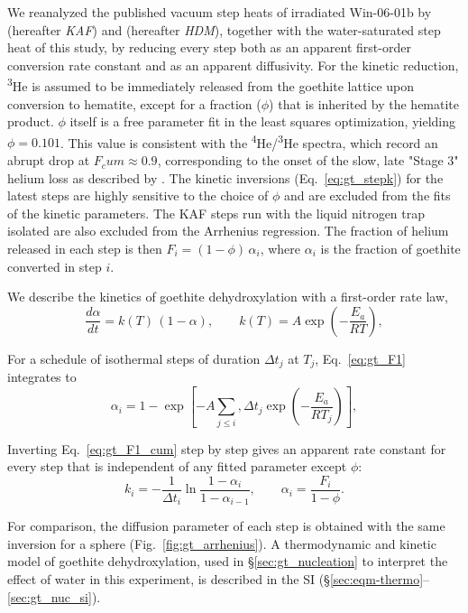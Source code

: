 We reanalyzed the published vacuum step heats of irradiated Win-06-01b by \citet{farley2024} (hereafter \emph{KAF}) and
\citet{monteiro2017} (hereafter \emph{HDM}), together with the water-saturated step heat of this study, by reducing every step
both as an apparent first-order conversion rate constant and as an apparent diffusivity.
For the kinetic reduction,
\textsuperscript{3}He is assumed to be immediately released from the goethite lattice upon conversion to hematite, except for a fraction ($\phi$)
that is inherited by the hematite product. $\phi$ itself is a free parameter fit in the least squares optimization, 
yielding $\phi=0.101$. This value is consistent with the \textsuperscript{4}He/\textsuperscript{3}He spectra, which record an abrupt 
drop at $F_cum \approx 0.9$, corresponding to the onset of the slow, late "Stage 3" helium loss as described by \citet{farley2024}. The kinetic inversions (Eq.~\eqref{eq:gt_stepk}) 
for the latest steps are highly sensitive to the choice of $\phi$ and are excluded from the fits of the kinetic parameters. 
The KAF steps run with the liquid nitrogen trap isolated are also excluded from the Arrhenius regression.
The fraction of helium released in each step is then $F_i = (1-\phi)\,\alpha_i$, where $\alpha_i$ 
is the fraction of goethite converted in step $i$.

We describe the kinetics of goethite dehydroxylation with a first-order rate law,
\begin{equation}
  \frac{d\alpha}{dt} = k(T)\,(1-\alpha),
  \qquad
  k(T) = A\exp\!\left(-\frac{E_a}{RT}\right),
  \label{eq:gt_F1}
\end{equation}

For a schedule of isothermal steps of duration $\Delta t_j$ at $T_j$, Eq.~\eqref{eq:gt_F1}
integrates to
\begin{equation}
  \alpha_i = 1 - \exp\!\left[-A\sum_{j\le i},\Delta t_j \exp\!\left(-\frac{E_a}{RT_j}\right)\right],
  \label{eq:gt_F1_cum}
\end{equation}

Inverting Eq.~\eqref{eq:gt_F1_cum} step by step gives an apparent rate constant for every
step that is independent of any fitted parameter except $\phi$:
\begin{equation}
  k_i = -\frac{1}{\Delta t_i}\ln\frac{1-\alpha_i}{1-\alpha_{i-1}},
  \qquad \alpha_i = \frac{F_i}{1-\phi}.
  \label{eq:gt_stepk}
\end{equation}

For comparison, the diffusion parameter of each step is obtained with the same
\citet{fechtigkalbitzer1966} inversion for a sphere (Fig.~\ref{fig:gt_arrhenius}). 
A thermodynamic and kinetic model of goethite dehydroxylation, used in
\S\ref{sec:gt_nucleation} to interpret the effect of water in this experiment, is described in the SI
(\S\ref{sec:eqm-thermo}--\ref{sec:gt_nuc_si}).

